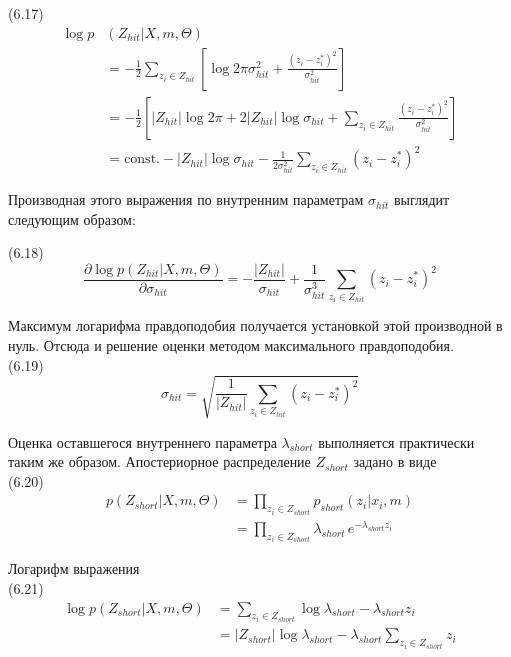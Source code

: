 \documentclass[10pt,a4paper]{article}
\begin{document}
(6.17)
\begin{equation*}
\begin{split}
\log p&(Z_{hit}|X,m,\varTheta)\\
&=-\frac{1}{2}\sum_{z_i\in Z_{hit}}\left[ \log2\pi\sigma_{hit}^2+\frac{(z_i-z_i^*)^2}{\sigma_{hit}^2}\right] \\
&=-\frac{1}{2}\left[ |Z_{hit}|\log2\pi+2|Z_{hit}|\log\sigma_{hit}+\sum_{z_i\in Z_{hit}}\frac{(z_i-z_i^*)^2}{\sigma_{hit}^2}\right] \\
&=\text{const.}-|Z_{hit}|\log\sigma_{hit}-\frac{1}{2\sigma_{hit}^2}\sum_{z_i\in Z_{hit}}(z_i-z_i^*)^2
\end{split}
\end{equation*}

Производная этого выражения по внутренним параметрам $\sigma_{hit}$ выглядит следующим образом:

(6.18)
$$\frac{\partial\log p(Z_{hit}|X,m,\varTheta)}{\partial\sigma_{hit}}=-\frac{|Z_{hit}|}{\sigma_{hit}}+\frac{1}{\sigma_{hit}^3}\sum_{z_i\in Z_{hit}}(z_i-z_i^*)^2$$

Максимум логарифма правдоподобия получается установкой этой производной в нуль. Отсюда и решение оценки методом максимального правдоподобия. \\

(6.19)
$$\sigma_{hit}=\sqrt{\frac{1}{|Z_{hit}|}\sum_{z_i\in Z_{hit}}(z_i-z_i^*)^2}$$

Оценка оставшегося внутреннего параметра $\lambda_{short}$ выполняется практически таким же образом. Апостериорное распределение $Z_{short}$ задано в виде\\

(6.20)
\begin{equation*}
\begin{split}
p(Z_{short}|X,m,\varTheta)&=\prod_{z_i\in Z_{short}}p_{short}(z_i|x_i,m)\\
&=\prod_{z_i\in Z_{short}}\lambda_{short}\,e^{-\lambda_{short}z_i}
\end{split}
\end{equation*}

Логарифм выражения\\

(6.21)
\begin{equation*}
\begin{split}
\log p(Z_{short}|X,m,\varTheta)&=\sum_{z_i\in Z_{short}}\log\lambda_{short}-\lambda_{short}z_i\\
&=|Z_{short}|\log\lambda_{short}-\lambda_{short}\sum_{z_i\in Z_{short}}z_i
\end{split}
\end{equation*}
\end{document}
